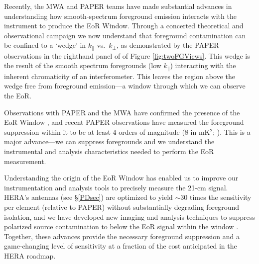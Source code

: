 \documentclass[preprint]{aastex}
\def\kperp{k_{\bot}}
\def\kpar{k_{\|}}
\begin{document}
Recently, the MWA and PAPER teams have made substantial advances in understanding how smooth-spectrum 
foreground emission interacts with the instrument to produce the EoR Window.
Through a concerted theoretical and observational campaign
\citep{morales_et_al2012,parsons_et_al2012b,vedantham_2012,Datta_2010,hazelton_et_al2013,pober_et_al2013,parsons_et_al2013,dillon_et_al2013b}
we now understand that foreground contamination can be confined to a `wedge' in
$\kpar$ vs.\ $\kperp$, as demonstrated by the PAPER observations in the
righthand panel of of Figure \ref{fig:twoFGViews}. This wedge is the result of
the smooth spectrum foregrounds 
(low $\kpar$) interacting with the inherent
chromaticity of an interferometer. 
This leaves the region above the wedge free from 
foreground emission---a window through which we can observe the EoR.

Observations with PAPER and the MWA have confirmed the presence of the EoR Window
\citep{pober_et_al2013,dillon_et_al2013b}, and recent PAPER observations
have measured the foreground suppression within it
to be at least 4 orders of magnitude 
(8 in mK$^2$;
\citealt{parsons_et_al2013}).
This is a major advance---we can
suppress foregrounds and we understand the instrumental and analysis
characteristics needed to perform the EoR measurement.

Understanding the origin of the EoR Window has enabled us to improve our
instrumentation and analysis 
tools to precisely measure the 21-cm
signal. HERA's antennas (see \S \ref{PDsec}) are optimized 
to yield $\sim$30
times the sensitivity per element (relative to PAPER) without substantially degrading
foreground isolation,
and we have developed new imaging and
analysis techniques to suppress polarized source contamination to below the EoR
signal within the window \citep{bernardi_2013_trunc,moore_et_al2013}.
Together, these advances provide the necessary foreground suppression and
a game-changing level of sensitivity at a fraction of the
cost anticipated in the HERA roadmap.
\end{document}

